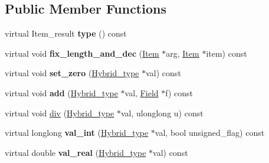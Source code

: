 \subsection*{Public Member Functions}
\begin{DoxyCompactItemize}
\item 
\mbox{\label{structHybrid__type__traits__decimal_a6466d7d4ca678fd6fc64bf4211030ffa}} 
virtual Item\+\_\+result {\bfseries type} () const
\item 
\mbox{\label{structHybrid__type__traits__decimal_a761c678e80cbafa9391dbd08fb0e24dd}} 
virtual void {\bfseries fix\+\_\+length\+\_\+and\+\_\+dec} (\mbox{\hyperlink{classItem}{Item}} $\ast$arg, \mbox{\hyperlink{classItem}{Item}} $\ast$item) const
\item 
\mbox{\label{structHybrid__type__traits__decimal_a5fced03048616976a554c543e20acb07}} 
virtual void {\bfseries set\+\_\+zero} (\mbox{\hyperlink{structHybrid__type}{Hybrid\+\_\+type}} $\ast$val) const
\item 
\mbox{\label{structHybrid__type__traits__decimal_a7e64859c927c8292b68a1ea1f4420744}} 
virtual void {\bfseries add} (\mbox{\hyperlink{structHybrid__type}{Hybrid\+\_\+type}} $\ast$val, \mbox{\hyperlink{classField}{Field}} $\ast$f) const
\item 
virtual void \mbox{\hyperlink{structHybrid__type__traits__decimal_abacf79142edb4cc12105279b750ac73d}{div}} (\mbox{\hyperlink{structHybrid__type}{Hybrid\+\_\+type}} $\ast$val, ulonglong u) const
\item 
\mbox{\label{structHybrid__type__traits__decimal_af714e352780ef6686f4e854e30da0814}} 
virtual longlong {\bfseries val\+\_\+int} (\mbox{\hyperlink{structHybrid__type}{Hybrid\+\_\+type}} $\ast$val, bool unsigned\+\_\+flag) const
\item 
\mbox{\label{structHybrid__type__traits__decimal_a99f78accef97398d0ef53d105c2c4249}} 
virtual double {\bfseries val\+\_\+real} (\mbox{\hyperlink{structHybrid__type}{Hybrid\+\_\+type}} $\ast$val) const
\item 
\mbox{\label{structHybrid__type__traits__decimal_aabb40550ae2f61857c3539d67781a6b1}} 

\end{DoxyCompactItemize}
